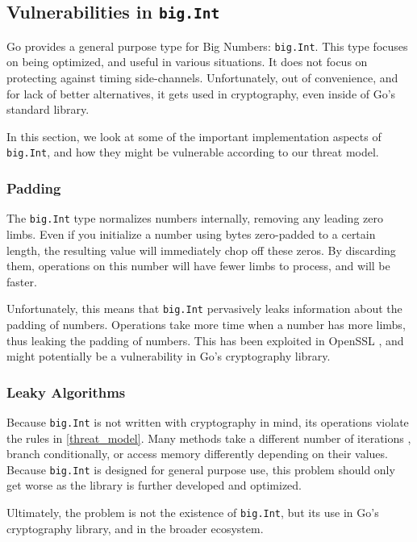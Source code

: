 \documentclass[11pt, a4paper]{article} %
\begin{document}
{\subsection{Vulnerabilities in \texttt{big.Int}}

Go provides a general purpose type for Big Numbers: \texttt{big.Int}.
This type focuses on being optimized, and useful in various
situations. It does not focus on protecting against timing side-channels.
Unfortunately, out of convenience,
and for lack of better alternatives, it gets used in
cryptography, even inside of Go's standard library.

In this section, we look at some of the important implementation aspects
of \texttt{big.Int}, and how they might be vulnerable
according to our threat model.

\subsubsection{Padding}

The \texttt{big.Int} type normalizes numbers internally,
removing any leading zero limbs. Even if you initialize a number
using bytes zero-padded to a certain length, the resulting value
will immediately chop off these zeros.
By discarding them, operations on
this number will have fewer limbs to process, and will be faster.

Unfortunately, this means that \texttt{big.Int} pervasively leaks information
about the padding of numbers. Operations
take more time when a number has more limbs,
thus leaking the padding of numbers.
This has been exploited
in OpenSSL \cite{merget_raccoon_2019}, and might potentially
be a vulnerability in Go's cryptography library.

\subsubsection{Leaky Algorithms}

Because \texttt{big.Int} is not written with cryptography in mind,
its operations violate the rules in
\ref{threat_model}. Many methods take a different number of iterations
, branch conditionally, or
access memory differently
depending on their values. Because \texttt{big.Int}
is designed for general purpose use, this problem should only get worse
as the library is further developed and optimized.

Ultimately, the problem is not the existence of \texttt{big.Int},
but its use in Go's cryptography library, and in the broader ecosystem.

}
\end{document}
